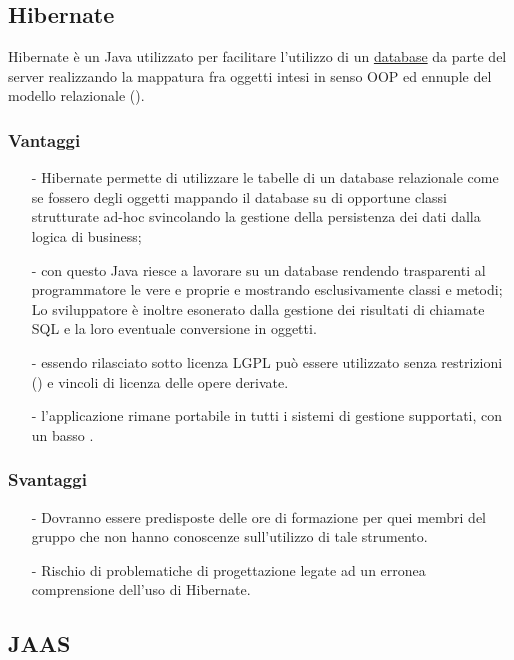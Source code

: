 \subsection{Hibernate}\label{sec:hibernate}

Hibernate è un  Java utilizzato per facilitare l'utilizzo di un \underline{database} da parte del server realizzando la mappatura fra oggetti intesi in senso OOP ed ennuple del modello relazionale ().

\subsubsection*{Vantaggi}
\begin{itemize}[noitemsep,nolistsep]
\item[-] Hibernate permette di utilizzare le tabelle di un database relazionale come se fossero degli oggetti mappando il database su di opportune classi strutturate ad-hoc svincolando la gestione della persistenza dei dati dalla logica di business;
\item[-] con questo  Java riesce a lavorare su un database rendendo trasparenti al programmatore le vere e proprie  e mostrando esclusivamente classi e metodi; Lo sviluppatore è inoltre esonerato dalla gestione dei risultati di chiamate SQL e la loro eventuale conversione in oggetti.
\item[-] essendo rilasciato sotto licenza LGPL può essere utilizzato senza restrizioni () e vincoli di licenza delle opere derivate.
\item[-] l'applicazione rimane portabile in tutti i sistemi di gestione supportati, con un basso .
\end{itemize}

\subsubsection*{Svantaggi}
\begin{itemize}[noitemsep,nolistsep]
  \item[-] Dovranno essere predisposte delle ore di formazione per quei membri del gruppo che non hanno conoscenze sull'utilizzo di tale strumento.
  \item[-] Rischio di problematiche di progettazione legate ad un erronea comprensione dell'uso di Hibernate.
\end{itemize}

\subsection{JAAS}\label{sec:hibernate}

